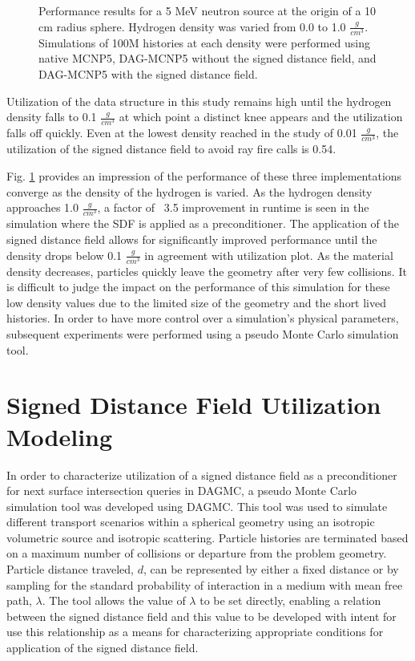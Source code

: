 \begin{figure}[ht]
  \centering
  {\textwidth}
  \caption{Performance results for a 5 MeV neutron source at the origin of a 10
    cm radius sphere. Hydrogen density was varied from 0.0 to 1.0
    $\frac{g}{cm^3}$. Simulations of 100M histories at each density were
    performed using native MCNP5, DAG-MCNP5 without the signed distance field,
    and DAG-MCNP5 with the signed distance field.}
  \label{fig:sphere_hydrogen_density_study_perf}
\end{figure}

Utilization of the data structure in this study remains high until the hydrogen
density falls to 0.1 $\frac{g}{cm^3}$ at which point a distinct knee appears and
the utilization falls off quickly. Even at the lowest density reached in the
study of 0.01 $\frac{g}{cm^3}$, the utilization of the signed distance field to
avoid ray fire calls is 0.54.


Fig. \ref{fig:sphere_hydrogen_density_study_perf} provides an impression of the
performance of these three implementations converge as the density of the
hydrogen is varied. As the hydrogen density approaches 1.0 $\frac{g}{cm^3}$, a
factor of ~3.5 improvement in runtime is seen in the simulation where the SDF is
applied as a preconditioner. The application of the signed distance field allows
for significantly improved performance until the density drops below 0.1
$\frac{g}{cm^3}$ in agreement with utilization plot. As the material density
decreases, particles quickly leave the geometry after very few collisions. It is
difficult to judge the impact on the performance of this simulation for these
low density values due to the limited size of the geometry and the short lived
histories.  In order to have more control over a simulation's physical
parameters, subsequent experiments were performed using a pseudo Monte Carlo
simulation tool.

\section{Signed Distance Field Utilization Modeling}

In order to characterize utilization of a signed distance field as a
preconditioner for next surface intersection queries in DAGMC, a pseudo Monte
Carlo simulation tool was developed using DAGMC. This tool was used to simulate
different transport scenarios within a spherical geometry using an isotropic
volumetric source and isotropic scattering. Particle histories are terminated
based on a maximum number of collisions or departure from the problem
geometry. Particle distance traveled, $d$, can be represented by either a fixed
distance or by sampling for the standard probability of interaction in a medium
with mean free path, $\lambda$. The tool allows the value of $\lambda$ to be set
directly, enabling a relation between the signed distance field and this value
to be developed with intent for use this relationship as a means for
characterizing appropriate conditions for application of the signed distance
field.

